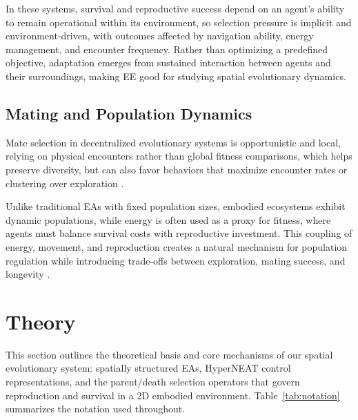 \documentclass[dvipsnames,format=sigconf,anonymous=false,review=false]{acmart}
\begin{document}
In these systems, survival and reproductive success depend on an agent’s ability to remain operational within its environment, so selection pressure is implicit and environment-driven, with outcomes affected by navigation ability, energy management, and encounter frequency. Rather than optimizing a predefined objective, adaptation emerges from sustained interaction between agents and their surroundings, making EE good for studying spatial evolutionary dynamics.


\subsection{Mating and Population Dynamics}
Mate selection in decentralized evolutionary systems is opportunistic and local, relying on physical encounters rather than global fitness comparisons, which helps preserve diversity, but can also favor behaviors that maximize encounter rates or clustering over exploration \cite{diependaal_how_nodate}. 

Unlike traditional EAs with fixed population sizes, embodied ecosystems exhibit dynamic populations, while energy is often used as a proxy for fitness, where agents must balance survival costs with reproductive investment. This coupling of energy, movement, and reproduction creates a natural mechanism for population regulation while introducing trade-offs between exploration, mating success, and longevity \cite{yao_parallel_2004, bredeche_environment-driven_2012}.



\section{Theory}
This section outlines the theoretical basis and core mechanisms of our spatial evolutionary system: spatially structured EAs, HyperNEAT control representations, and the parent/death selection operators that govern reproduction and survival in a 2D embodied environment. Table~\ref{tab:notation} summarizes the notation used throughout.
\end{document}
